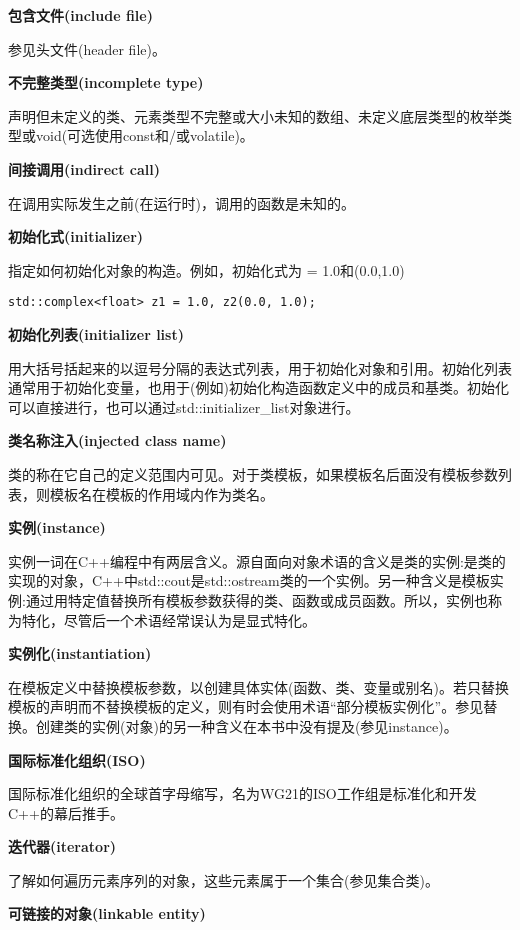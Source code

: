\noindent
\textbf{包含文件(include file)}

参见头文件(header file)。

\noindent
\textbf{不完整类型(incomplete type)}

声明但未定义的类、元素类型不完整或大小未知的数组、未定义底层类型的枚举类型或void(可选使用const和/或volatile)。

\noindent
\textbf{间接调用(indirect call)}

在调用实际发生之前(在运行时)，调用的函数是未知的。

\noindent
\textbf{初始化式(initializer)}

指定如何初始化对象的构造。例如，初始化式为 = 1.0和(0.0,1.0)
\begin{lstlisting}[style=styleCXX]
std::complex<float> z1 = 1.0, z2(0.0, 1.0);
\end{lstlisting}

\noindent
\textbf{初始化列表(initializer list)}

用大括号括起来的以逗号分隔的表达式列表，用于初始化对象和引用。初始化列表通常用于初始化变量，也用于(例如)初始化构造函数定义中的成员和基类。初始化可以直接进行，也可以通过std::initializer\_list对象进行。

\noindent
\textbf{类名称注入(injected class name)}

类的称在它自己的定义范围内可见。对于类模板，如果模板名后面没有模板参数列表，则模板名在模板的作用域内作为类名。

\noindent
\textbf{实例(instance)}

实例一词在C++编程中有两层含义。源自面向对象术语的含义是类的实例:是类的实现的对象，C++中std::cout是std::ostream类的一个实例。另一种含义是模板实例:通过用特定值替换所有模板参数获得的类、函数或成员函数。所以，实例也称为特化，尽管后一个术语经常误认为是显式特化。

\noindent
\textbf{实例化(instantiation)}

在模板定义中替换模板参数，以创建具体实体(函数、类、变量或别名)。若只替换模板的声明而不替换模板的定义，则有时会使用术语“部分模板实例化”。参见替换。创建类的实例(对象)的另一种含义在本书中没有提及(参见instance)。

\noindent
\textbf{国际标准化组织(ISO)}

国际标准化组织的全球首字母缩写，名为WG21的ISO工作组是标准化和开发C++的幕后推手。

\noindent
\textbf{迭代器(iterator)}

了解如何遍历元素序列的对象，这些元素属于一个集合(参见集合类)。

\noindent
\textbf{可链接的对象(linkable entity)}

